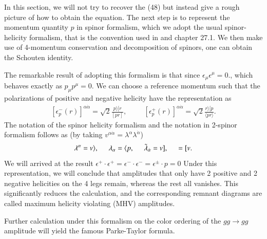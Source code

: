 \documentclass{article}
\begin{document}
\begin{appendices}
  

In this section, we will not try to recover the (48) but instead give a rough
picture of how to obtain the equation. The next step is to represent the
momentum quantity $p$ in spinor formalism, which we adopt the usual spinor-helicity formalism,
   that is the convention used in \cite{dixon2016brief} and
  \cite{schwartz2014quantum} chapter 27.1. We then make use of 4-momentum
  conservation and decomposition of spinors, one can obtain the Schouten
  identity. 

  The remarkable result of adopting this formalism is that since
  $\epsilon_{\mu} \epsilon^{\mu} = 0.$, which behaves exactly as $p_{\mu}
  p^{\mu} = 0.$ We can choose a reference momentum such that the 
  polarizations of positive and negative helicity have the
  representation as 
      \begin{align}
    \label{spinor helicity formalism}
        [\epsilon^-_p(r)]^{\alpha \dot{\alpha}} = \sqrt{2}
        \frac{p\rangle [r}{[pr]}, \hspace{1cm}  [\epsilon^+_p(r)]^{\alpha \dot{\alpha}} = \sqrt{2}
        \frac{r\rangle [p}{\langle pr \rangle}.
   \end{align}
  The notation of the spinor helicity formalism and the notation in 2-spinor
  formalism follows as (by taking $v^{\alpha \dot{\alpha}} =
  \lambda^{\alpha} \lambda^{\dot{\alpha}}$)
  \begin{align}
    \label{co}
    \lambda^{\alpha} = v\rangle, \hspace{0.5cm} \lambda_{\alpha}
    = \langle p, \hspace{0.5cm} \tilde \lambda_{\dot{\alpha}} = v],
    \hspace{0.5cm} = [v.
  \end{align}
We will arrived at the result $ \epsilon^+ \cdot \epsilon^+ =\epsilon^- \cdot
\epsilon^- = \epsilon^{\pm} \cdot p = 0   $  
Under this representation, we will conclude that amplitudes that only have 2
positive and 2 negative helicities on the 4 legs remain, whereas the rest all
vanishes. This significantly reduces the calculation, and the corresponding
remnant diagrams are called maximum helicity violating (MHV) amplitudes.

Further calculation under this formalism on the color ordering of the $gg \to
gg$ amplitude will yield the famous Parke-Taylor formula. 


\end{appendices}




        
\end{document}
